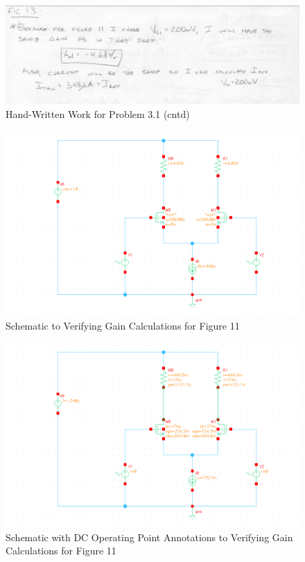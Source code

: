 \documentclass{article}
\begin{document}
\begin{figure}[H]
\centering
\includegraphics[width=6in]{1_9a}
\caption{Hand-Written Work for Problem 3.1 (cntd)}
\label{3_1a}
\end{figure}

\begin{figure}[H]
\centering
\includegraphics[width=6in]{p3_1a_schem}
\caption{Schematic to Verifying Gain Calculations for Figure 11}
\label{3_1a_schem}
\end{figure}

\begin{figure}[H]
\centering
\includegraphics[width=6in]{p3_1a_dcop}
\caption{Schematic with DC Operating Point Annotations to Verifying Gain Calculations for Figure 11}
\label{3_1a_dcop}
\end{figure}
\end{document}
